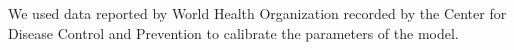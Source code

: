 We used data reported by World Health Organization recorded by the Center for Disease Control and Prevention \cite{CDCData} to calibrate the parameters of the model. 